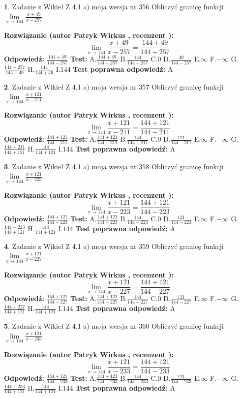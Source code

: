 \documentclass[12pt, a4paper]{article}
\theoremstyle{definition} %
\newtheorem{zad}{}
\newcommand{\zadStart}[1]{\begin{zad}#1\newline}
\newcommand{\zadStop}{\end{zad}}
\newcommand{\rozwStart}[2]{\noindent \textbf{Rozwiązanie (autor #1 , recenzent #2): }\newline}
\newcommand{\rozwStop}{\newline}
\newcommand{\odpStart}{\noindent \textbf{Odpowiedź:}\newline}
\newcommand{\odpStop}{\newline}
\newcommand{\testStart}{\noindent \textbf{Test:}\newline}
\newcommand{\testStop}{\newline}
\newcommand{\kluczStart}{\noindent \textbf{Test poprawna odpowiedź:}\newline}
\newcommand{\kluczStop}{\newline}
\begin{document}
\zadStart{Zadanie z Wikieł Z 4.1 a) moja wersja nr 356}
Obliczyć granicę funkcji $\lim\limits_{x\to144}\frac{x+49}{x-257}$.
\zadStop
\rozwStart{Patryk Wirkus}{}
$$\lim\limits_{x\to144}\frac{x+49}{x-257} = \frac{144+49}{144-257}$$
\rozwStop
\odpStart
$\frac{144+49}{144-257}$
\odpStop
\testStart
A.$\frac{144+49}{144-257}$
B.$\frac{144}{144-257}$
C.$0$
D.$\frac{49}{144-257}$
E.$\infty$
F.$-\infty$
G.$\frac{144-257}{144+49}$
H.$\frac{144}{144+49}$
I.$144$
\testStop
\kluczStart
A
\kluczStop



\zadStart{Zadanie z Wikieł Z 4.1 a) moja wersja nr 357}
Obliczyć granicę funkcji $\lim\limits_{x\to144}\frac{x+121}{x-211}$.
\zadStop
\rozwStart{Patryk Wirkus}{}
$$\lim\limits_{x\to144}\frac{x+121}{x-211} = \frac{144+121}{144-211}$$
\rozwStop
\odpStart
$\frac{144+121}{144-211}$
\odpStop
\testStart
A.$\frac{144+121}{144-211}$
B.$\frac{144}{144-211}$
C.$0$
D.$\frac{121}{144-211}$
E.$\infty$
F.$-\infty$
G.$\frac{144-211}{144+121}$
H.$\frac{144}{144+121}$
I.$144$
\testStop
\kluczStart
A
\kluczStop



\zadStart{Zadanie z Wikieł Z 4.1 a) moja wersja nr 358}
Obliczyć granicę funkcji $\lim\limits_{x\to144}\frac{x+121}{x-223}$.
\zadStop
\rozwStart{Patryk Wirkus}{}
$$\lim\limits_{x\to144}\frac{x+121}{x-223} = \frac{144+121}{144-223}$$
\rozwStop
\odpStart
$\frac{144+121}{144-223}$
\odpStop
\testStart
A.$\frac{144+121}{144-223}$
B.$\frac{144}{144-223}$
C.$0$
D.$\frac{121}{144-223}$
E.$\infty$
F.$-\infty$
G.$\frac{144-223}{144+121}$
H.$\frac{144}{144+121}$
I.$144$
\testStop
\kluczStart
A
\kluczStop



\zadStart{Zadanie z Wikieł Z 4.1 a) moja wersja nr 359}
Obliczyć granicę funkcji $\lim\limits_{x\to144}\frac{x+121}{x-227}$.
\zadStop
\rozwStart{Patryk Wirkus}{}
$$\lim\limits_{x\to144}\frac{x+121}{x-227} = \frac{144+121}{144-227}$$
\rozwStop
\odpStart
$\frac{144+121}{144-227}$
\odpStop
\testStart
A.$\frac{144+121}{144-227}$
B.$\frac{144}{144-227}$
C.$0$
D.$\frac{121}{144-227}$
E.$\infty$
F.$-\infty$
G.$\frac{144-227}{144+121}$
H.$\frac{144}{144+121}$
I.$144$
\testStop
\kluczStart
A
\kluczStop



\zadStart{Zadanie z Wikieł Z 4.1 a) moja wersja nr 360}
Obliczyć granicę funkcji $\lim\limits_{x\to144}\frac{x+121}{x-233}$.
\zadStop
\rozwStart{Patryk Wirkus}{}
$$\lim\limits_{x\to144}\frac{x+121}{x-233} = \frac{144+121}{144-233}$$
\rozwStop
\odpStart
$\frac{144+121}{144-233}$
\odpStop
\testStart
A.$\frac{144+121}{144-233}$
B.$\frac{144}{144-233}$
C.$0$
D.$\frac{121}{144-233}$
E.$\infty$
F.$-\infty$
G.$\frac{144-233}{144+121}$
H.$\frac{144}{144+121}$
I.$144$
\testStop
\kluczStart
A
\kluczStop
\end{document}
